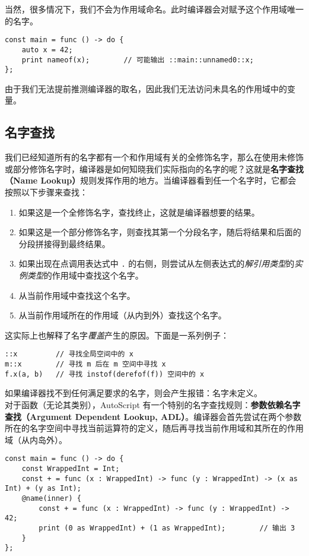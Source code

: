 当然，很多情况下，我们不会为作用域命名。此时编译器会对赋予这个作用域唯一的名字。

\begin{lstlisting}
const main = func () -> do {
	auto x = 42;
	print nameof(x);		// 可能输出 ::main::unnamed0::x;
};
\end{lstlisting}

由于我们无法提前推测编译器的取名，因此我们无法访问未具名的作用域中的变量。

\subsection{名字查找}

我们已经知道所有的名字都有一个和作用域有关的全修饰名字，那么在使用未修饰或部分修饰名字时，编译器是如何知晓我们实际指向的名字的呢？这就是\textbf{名字查找（Name Lookup）}规则发挥作用的地方。当编译器看到任一个名字时，它都会按照以下步骤来查找：

\begin{enumerate}
	\item 如果这是一个全修饰名字，查找终止，这就是编译器想要的结果。
	\item 如果这是一个部分修饰名字，则查找其第一个分段名字，随后将结果和后面的分段拼接得到最终结果。
	\item 如果出现在点调用表达式中 \lstinline!.! 的右侧，则尝试从左侧表达式的\emph{解引用类型}的\emph{实例类型}的作用域中查找这个名字。
	\item 从当前作用域中查找这个名字。
	\item 从当前作用域所在的作用域（从内到外）查找这个名字。
\end{enumerate}

这实际上也解释了名字\emph{覆盖}产生的原因。下面是一系列例子：

\begin{lstlisting}
::x			// 寻找全局空间中的 x
m::x		// 寻找 m 后在 m 空间中寻找 x
f.x(a, b)	// 寻找 instof(derefof(f)) 空间中的 x
\end{lstlisting}

如果编译器找不到任何满足要求的名字，则会产生报错：名字未定义。 \\

对于函数（无论其类别），AutoScript 有一个特别的名字查找规则：\textbf{参数依赖名字查找（Argument Dependent Lookup, ADL）}。编译器会首先尝试在两个参数所在的名字空间中寻找当前运算符的定义，随后再寻找当前作用域和其所在的作用域（从内岛外）。

\begin{lstlisting}
const main = func () -> do {
	const WrappedInt = Int;
	const + = func (x : WrappedInt) -> func (y : WrappedInt) -> (x as Int) + (y as Int);
	@name(inner) {
		const + = func (x : WrappedInt) -> func (y : WrappedInt) -> 42;
		print (0 as WrappedInt) + (1 as WrappedInt);		// 输出 3
	}
};
\end{lstlisting}


